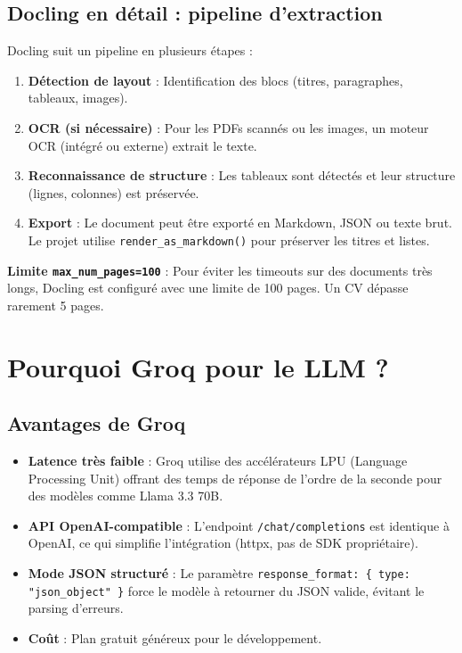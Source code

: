 \documentclass[11pt,a4paper]{report}
\begin{document}
\subsection{Docling en détail : pipeline d'extraction}

Docling suit un pipeline en plusieurs étapes :
\begin{enumerate}[leftmargin=*]
  \item \textbf{Détection de layout} : Identification des blocs (titres, paragraphes, tableaux, images).
  \item \textbf{OCR (si nécessaire)} : Pour les PDFs scannés ou les images, un moteur OCR (intégré ou externe) extrait le texte.
  \item \textbf{Reconnaissance de structure} : Les tableaux sont détectés et leur structure (lignes, colonnes) est préservée.
  \item \textbf{Export} : Le document peut être exporté en Markdown, JSON ou texte brut. Le projet utilise \texttt{render\_as\_markdown()} pour préserver les titres et listes.
\end{enumerate}

\textbf{Limite \texttt{max\_num\_pages=100}} : Pour éviter les timeouts sur des documents très longs, Docling est configuré avec une limite de 100 pages. Un CV dépasse rarement 5 pages.

\section{Pourquoi Groq pour le LLM ?}

\subsection{Avantages de Groq}

\begin{itemize}[leftmargin=*]
  \item \textbf{Latence très faible} : Groq utilise des accélérateurs LPU (Language Processing Unit) offrant des temps de réponse de l'ordre de la seconde pour des modèles comme Llama 3.3 70B.
  \item \textbf{API OpenAI-compatible} : L'endpoint \texttt{/chat/completions} est identique à OpenAI, ce qui simplifie l'intégration (httpx, pas de SDK propriétaire).
  \item \textbf{Mode JSON structuré} : Le paramètre \texttt{response\_format: \{ type: "json\_object" \}} force le modèle à retourner du JSON valide, évitant le parsing d'erreurs.
  \item \textbf{Coût} : Plan gratuit généreux pour le développement.
\end{itemize}
\end{document}
